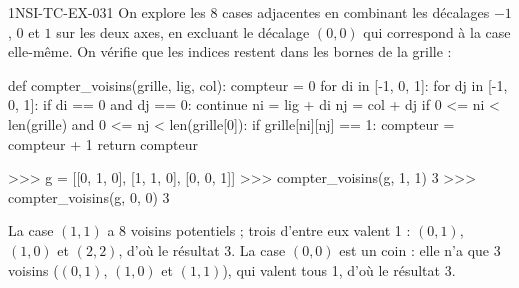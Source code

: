 \begin{corrige}{1NSI-TC-EX-031}
On explore les 8 cases adjacentes en combinant les décalages $-1$, $0$ et $1$ sur les deux axes, en excluant le décalage $(0, 0)$ qui correspond à la case elle-même. On vérifie que les indices restent dans les bornes de la grille :

\begin{python}
def compter_voisins(grille, lig, col):
    compteur = 0
    for di in [-1, 0, 1]:
        for dj in [-1, 0, 1]:
            if di == 0 and dj == 0:
                continue
            ni = lig + di
            nj = col + dj
            if 0 <= ni < len(grille) and 0 <= nj < len(grille[0]):
                if grille[ni][nj] == 1:
                    compteur = compteur + 1
    return compteur
\end{python}

\begin{console}
>>> g = [[0, 1, 0], [1, 1, 0], [0, 0, 1]]
>>> compter_voisins(g, 1, 1)
3
>>> compter_voisins(g, 0, 0)
3
\end{console}

La case $(1, 1)$ a 8 voisins potentiels ; trois d'entre eux valent 1 : $(0, 1)$, $(1, 0)$ et $(2, 2)$, d'où le résultat 3. La case $(0, 0)$ est un coin : elle n'a que 3 voisins ($(0, 1)$, $(1, 0)$ et $(1, 1)$), qui valent tous 1, d'où le résultat 3.
\end{corrige}
